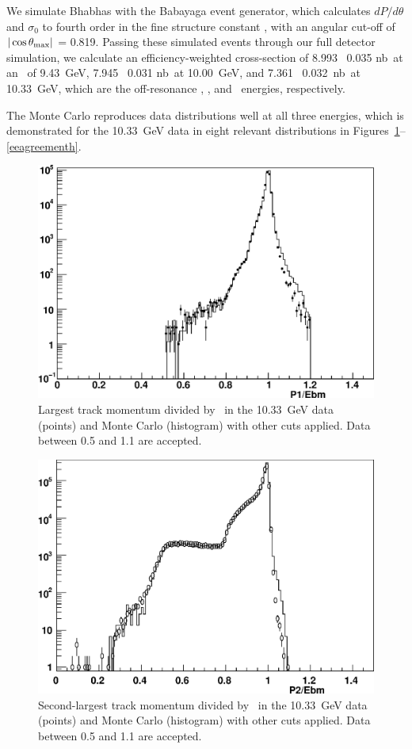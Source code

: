 \documentclass{cornell}
\begin{document}
We simulate Bhabhas with the Babayaga event generator, which
calculates $dP/d\theta$ and $\sigma_0$ to fourth order in the fine
structure constant \cite{babayaga}, with an angular cut-off of
$|\cos\theta_{\mbox{\scriptsize max}}|$ = 0.819.  Passing these simulated events
through our full detector simulation, we calculate an
efficiency-weighted cross-section of 8.993 \PM\ 0.035 nb\inv\ at an
\ecm\ of 9.43~GeV, 7.945 \PM\ 0.031 nb\inv\ at 10.00~GeV, and 7.361
\PM\ 0.032~nb\inv\ at 10.33~GeV, which are the off-resonance \us,
\uss, and \usss\ energies, respectively.

The Monte Carlo reproduces data distributions well at all three
energies, which is demonstrated for the 10.33~GeV data in eight
relevant distributions in
Figures~\mbox{\ref{eeagreementa}--\ref{eeagreementh}}.

\begin{figure}[p]
  \begin{center}
    \includegraphics[width=0.7\linewidth]{eeagreementb}
  \end{center}
  \caption[Largest track momentum distribution in Bhabha events]{\label{eeagreementa} Largest track momentum divided by
  \ebeam\ in the 10.33~GeV data (points) and Monte Carlo (histogram)
  with other cuts applied.  Data between 0.5 and 1.1 are accepted.}
\end{figure}

\begin{figure}[p]
  \begin{center}
    \includegraphics[width=0.7\linewidth]{eeagreementc}
  \end{center}
  \caption[Second-largest track momentum distribution in Bhabha events]{\label{eeagreementb} Second-largest track momentum divided
  by \ebeam\ in the 10.33~GeV data (points) and Monte Carlo
  (histogram) with other cuts applied.  Data between 0.5 and 1.1 are
  accepted.}
\end{figure}
\end{document}
